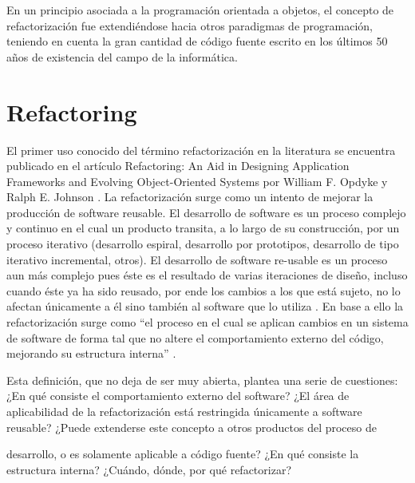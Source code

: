 En un principio asociada a la programación orientada a objetos, el concepto
de refactorización fue extendiéndose hacia otros paradigmas de programación,
teniendo en cuenta la gran cantidad de código fuente escrito en los
últimos 50 años de existencia del campo de la informática.

\section{Refactoring}
El primer uso conocido del término refactorización en la literatura se
encuentra publicado en el artículo Refactoring: An Aid in Designing Application
Frameworks and Evolving Object-Oriented Systems por William F.
Opdyke y Ralph E. Johnson \cite{REF04}. La refactorización surge como un intento
de mejorar la producción de software reusable. El desarrollo de software es
un proceso complejo y continuo en el cual un producto transita, a lo largo de
su construcción, por un proceso iterativo (desarrollo espiral, desarrollo por
prototipos, desarrollo de tipo iterativo incremental, otros). El desarrollo de
software re-usable es un proceso aun más complejo pues éste es el resultado
de varias iteraciones de diseño, incluso cuando éste ya ha sido reusado, por
ende los cambios a los que está sujeto, no lo afectan únicamente a él sino
también al software que lo utiliza \cite{REF05}. En base a ello la refactorización surge
como “el proceso en el cual se aplican cambios en un sistema de software de
forma tal que no altere el comportamiento externo del código, mejorando su
estructura interna” \cite{REF03}.

Esta definición, que no deja de ser muy abierta, plantea una serie de cuestiones:
¿En qué consiste el comportamiento externo del software? ¿El área
de aplicabilidad de la refactorización está restringida únicamente a software
reusable? ¿Puede extenderse este concepto a otros productos del proceso de

desarrollo, o es solamente aplicable a código fuente? ¿En qué consiste la estructura
interna? ¿Cuándo, dónde, por qué refactorizar?


